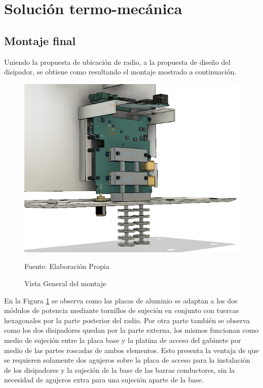 \section{Solución termo-mecánica}

\subsection{Montaje final}

Uniendo la propuesta de ubicación de radio, a la propuesta de diseño del disipador, se obtiene como resultando el montaje mostrado a continuación. 
\begin{figure}[H]
\centering
\includegraphics[scale=0.65]{Figuras/G7.png}
\caption{Vista General del montaje}
Fuente: Elaboración Propia
\label{solucion1}
\end{figure}

En la Figura \ref{solucion1} se observa como las placas de aluminio se adaptan a los dos módulos de potencia mediante tornillos de sujeción en conjunto con tuercas hexagonales por la parte posterior del radio. Por otra parte también se observa como los dos disipadores quedan por la parte externa, los mismos funcionan como medio de sujeción entre la placa base y la platina de acceso del gabinete por medio de las partes roscadas de ambos elementos. Esto presenta la ventaja de que se requieren solamente dos agujeros sobre la placa de acceso para la instalación de los disipadores y la sujeción de la base de las barras conductores, sin la necesidad de agujeros extra para una sujeción aparte de la base.

